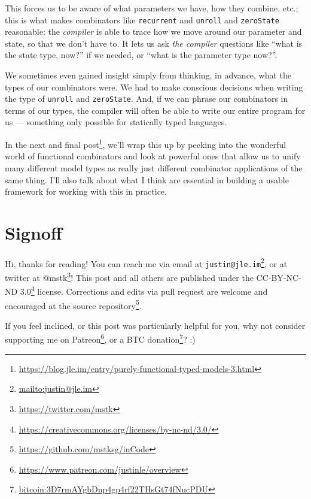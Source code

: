 \documentclass[]{article}
\renewcommand{\href}[2]{#2\footnote{\url{#1}}}
\begin{document}
\begin{enumerate}
  This forces us to be aware of what parameters we have, how they combine, etc.;
  this is what makes combinators like \texttt{recurrent} and \texttt{unroll} and
  \texttt{zeroState} reasonable: the \emph{compiler} is able to trace how we
  move around our parameter and state, so that we don't have to. It lets us ask
  \emph{the compiler} questions like ``what is the state type, now?'' if we
  needed, or ``what is the parameter type now?''.

  We sometimes even gained insight simply from thinking, in advance, what the
  types of our combinators were. We had to make conscious decisions when writing
  the type of \texttt{unroll} and \texttt{zeroState}. And, if we can phrase our
  combinators in terms of our types, the compiler will often be able to write
  our entire program for us --- something only possible for statically typed
  languages.
\end{enumerate}

In the
\href{https://blog.jle.im/entry/purely-functional-typed-models-3.html}{next and
final post}, we'll wrap this up by peeking into the wonderful world of
functional combinators and look at powerful ones that allow us to unify many
different model types as really just different combinator applications of the
same thing. I'll also talk about what I think are essential in building a usable
framework for working with this in practice.

\section{Signoff}\label{signoff}

Hi, thanks for reading! You can reach me via email at
\href{mailto:justin@jle.im}{\nolinkurl{justin@jle.im}}, or at twitter at
\href{https://twitter.com/mstk}{@mstk}! This post and all others are published
under the \href{https://creativecommons.org/licenses/by-nc-nd/3.0/}{CC-BY-NC-ND
3.0} license. Corrections and edits via pull request are welcome and encouraged
at \href{https://github.com/mstksg/inCode}{the source repository}.

If you feel inclined, or this post was particularly helpful for you, why not
consider \href{https://www.patreon.com/justinle/overview}{supporting me on
Patreon}, or a \href{bitcoin:3D7rmAYgbDnp4gp4rf22THsGt74fNucPDU}{BTC donation}?
:)
\end{document}
